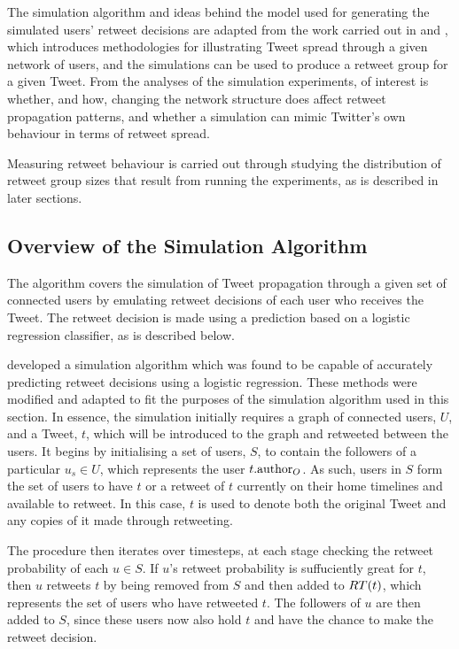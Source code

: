 The simulation algorithm and ideas behind the model used for generating the simulated users' retweet decisions are adapted from the work carried out in \cite{zhu11} and \cite{peng11}, which introduces methodologies for illustrating Tweet spread through a given network of users, and the simulations can be used to produce a retweet group for a given Tweet. From the analyses of the simulation experiments, of interest is whether, and how, changing the network structure does affect retweet propagation patterns, and whether a simulation can mimic Twitter's own behaviour in terms of retweet spread.

Measuring retweet behaviour is carried out through studying the distribution of retweet group sizes that result from running the experiments, as is described in later sections.


\subsection{Overview of the Simulation Algorithm}
The algorithm covers the simulation of Tweet propagation through a given set of connected users by emulating retweet decisions of each user who receives the Tweet. The retweet decision is made using a prediction based on a logistic regression classifier, as is described below.

\cite{zhu11} developed a simulation algorithm which was found to be capable of accurately predicting retweet decisions using a logistic regression. These methods were modified and adapted to fit the purposes of the simulation algorithm used in this section. In essence, the simulation initially requires a graph of connected users, $U$, and a Tweet, $t$, which will be introduced to the graph and retweeted between the users. It begins by initialising a set of users, $S$, to contain the followers of a particular $u_s \in U$, which represents the user $t.\textrm{author}_O$. As such, users in $S$ form the set of users to have $t$ or a retweet of $t$ currently on their home timelines and available to retweet. In this case, $t$ is used to denote both the original Tweet and any copies of it made through retweeting.

The procedure then iterates over timesteps, at each stage checking the retweet probability of each $u \in S$. If $u$'s retweet probability is suffuciently great for $t$, then $u$ retweets $t$ by being removed from $S$ and then added to $RT(t)$, which represents the set of users who have retweeted $t$. The followers of $u$ are then added to $S$, since these users now also hold $t$ and have the chance to make the retweet decision.

